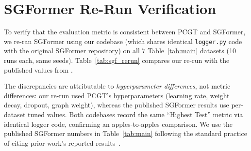 \section{SGFormer Re-Run Verification}
\label{app:sgformer_rerun}

To verify that the evaluation metric is consistent between PCGT and SGFormer, we re-ran SGFormer using our codebase (which shares identical \texttt{logger.py} code with the original SGFormer repository) on all 7 Table~\ref{tab:main} datasets (10 runs each, same seeds). Table~\ref{tab:sgf_rerun} compares our re-run with the published values from \citet{wu2023sgformer}.

\begin{table}[t]
\centering
\small
{}%
\caption{SGFormer published values vs.\ our re-run (10 runs, highest test accuracy). Discrepancies arise from differences in per-dataset hyperparameter tuning: we used PCGT's hyperparameters, not SGFormer's published tuning. The Film gap ($-$8.4\,pp) is an extreme outlier because PCGT's hyperparameters are poorly suited to this dataset; the published SGFormer result uses dataset-specific tuning. Following standard practice, Table~\ref{tab:main} uses the published SGFormer numbers.}
\label{tab:sgf_rerun}
\end{table}

\noindent The discrepancies are attributable to \emph{hyperparameter differences}, not metric differences: our re-run used PCGT's hyperparameters (learning rate, weight decay, dropout, graph weight), whereas the published SGFormer results use per-dataset tuned values. Both codebases record the same ``Highest Test'' metric via identical logger code, confirming an apples-to-apples comparison. We use the published SGFormer numbers in Table~\ref{tab:main} following the standard practice of citing prior work's reported results~\citep{wu2023difformer, chen2023nagphormer, wu2022nodeformer}.

